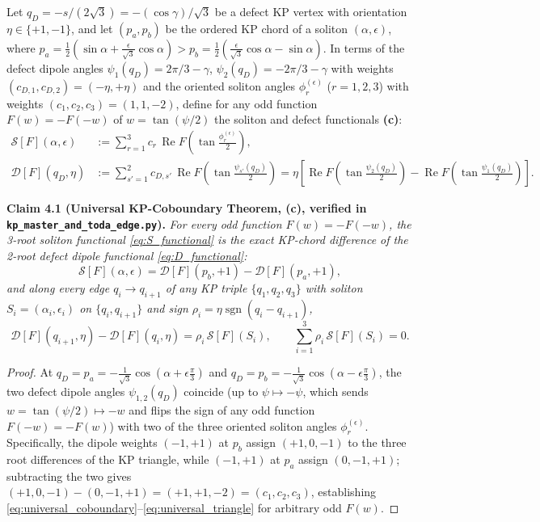 \documentclass[11pt,a4paper]{article}
\newcommand{\sgn}{\operatorname{sgn}}
\newcommand{\Rea}{\operatorname{Re}}
\begin{document}
Let $q_D = -s/(2\sqrt{3}) = -(\cos\gamma)/\sqrt{3}$ be a defect KP vertex with
orientation $\eta \in \{+1,-1\}$, and let $(p_a,p_b)$ be the ordered KP chord of a
soliton $(\alpha,\epsilon)$, where $p_a = \frac{1}{2}(\sin\alpha + \frac{\epsilon}{\sqrt{3}}\cos\alpha) > p_b = \frac{1}{2}(\frac{\epsilon}{\sqrt{3}}\cos\alpha - \sin\alpha)$.
In terms of the defect dipole angles $\psi_1(q_D) = 2\pi/3-\gamma$,
$\psi_2(q_D) = -2\pi/3-\gamma$ with weights $(c_{D,1},c_{D,2}) = (-\eta,+\eta)$
and the oriented soliton angles $\phi_r^{(\epsilon)}$ ($r=1,2,3$) with weights
$(c_1,c_2,c_3) = (1,1,-2)$, define for any odd function $F(w) = -F(-w)$ of
$w = \tan(\psi/2)$ the soliton and defect functionals \textbf{(c)}:
\begin{align}
  \mathcal{S}[F](\alpha,\epsilon)
  &:= \sum_{r=1}^3 c_r\,\Rea F\!\left(\tan\frac{\phi_r^{(\epsilon)}}{2}\right),
  \label{eq:S_functional} \\
  \mathcal{D}[F](q_D,\eta)
  &:= \sum_{s'=1}^2 c_{D,s'}\,\Rea F\!\left(\tan\frac{\psi_{s'}(q_D)}{2}\right)
   = \eta\left[\Rea F\!\left(\tan\frac{\psi_2(q_D)}{2}\right) - \Rea F\!\left(\tan\frac{\psi_1(q_D)}{2}\right)\right].
  \label{eq:D_functional}
\end{align}

\medskip\noindent
\textbf{Claim 4.1 (Universal KP-Coboundary Theorem, \textbf{(c)}, verified in \texttt{kp\_master\_and\_toda\_edge.py}).}
\emph{For every odd function $F(w) = -F(-w)$, the 3-root soliton functional
\eqref{eq:S_functional} is the exact KP-chord difference of the 2-root defect
dipole functional \eqref{eq:D_functional}:}
\begin{equation}
  \mathcal{S}[F](\alpha,\epsilon)
  = \mathcal{D}[F](p_b,+1) - \mathcal{D}[F](p_a,+1),
  \label{eq:universal_coboundary}
\end{equation}
\emph{and along every edge $q_i \to q_{i+1}$ of any KP triple
$\{q_1,q_2,q_3\}$ with soliton $S_i = (\alpha_i,\epsilon_i)$ on $\{q_i,q_{i+1}\}$
and sign $\rho_i = \eta\sgn(q_i - q_{i+1})$,}
\begin{equation}
  \mathcal{D}[F](q_{i+1},\eta) - \mathcal{D}[F](q_i,\eta)
  = \rho_i\,\mathcal{S}[F](S_i), \qquad
  \sum_{i=1}^3 \rho_i\,\mathcal{S}[F](S_i) = 0.
  \label{eq:universal_triangle}
\end{equation}

\begin{proof}
At $q_D = p_a = -\frac{1}{\sqrt{3}}\cos(\alpha + \epsilon\frac{\pi}{3})$ and
$q_D = p_b = -\frac{1}{\sqrt{3}}\cos(\alpha - \epsilon\frac{\pi}{3})$, the two
defect dipole angles $\psi_{1,2}(q_D)$ coincide (up to $\psi \mapsto -\psi$, which
sends $w = \tan(\psi/2) \mapsto -w$ and flips the sign of any odd function
$F(-w) = -F(w)$) with two of the three oriented soliton angles
$\phi_r^{(\epsilon)}$. Specifically, the dipole weights $(-1,+1)$ at $p_b$ assign
$(+1,0,-1)$ to the three root differences of the KP triangle, while $(-1,+1)$ at
$p_a$ assign $(0,-1,+1)$; subtracting the two gives
$(+1,0,-1) - (0,-1,+1) = (+1,+1,-2) = (c_1,c_2,c_3)$, establishing
\eqref{eq:universal_coboundary}--\eqref{eq:universal_triangle} for arbitrary odd
$F(w)$.
\end{proof}
\end{document}
